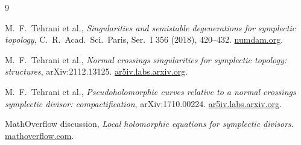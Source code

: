 \documentclass[11pt]{article}
\theoremstyle{definition}
\begin{document}
\begin{thebibliography}{9}

M.~F.~Tehrani et al., \emph{Singularities and semistable degenerations for symplectic topology}, C.~R.~Acad.~Sci.~Paris, Ser.~I 356 (2018), 420--432.
\href{https://www.numdam.org/item/10.1016/j.crma.2018.02.009.pdf}{numdam.org}.

M.~F.~Tehrani et al., \emph{Normal crossings singularities for symplectic topology: structures}, arXiv:2112.13125.
\href{https://ar5iv.labs.arxiv.org/html/2112.13125}{ar5iv.labs.arxiv.org}.

M.~F.~Tehrani et al., \emph{Pseudoholomorphic curves relative to a normal crossings symplectic divisor: compactification}, arXiv:1710.00224.
\href{https://ar5iv.labs.arxiv.org/html/1710.00224}{ar5iv.labs.arxiv.org}.

MathOverflow discussion, \emph{Local holomorphic equations for symplectic divisors}.
\href{https://mathoverflow.net/questions/154302/local-holomorphic-equations-for-symplectic-divisors}{mathoverflow.com}.

\end{thebibliography}
\end{document}
